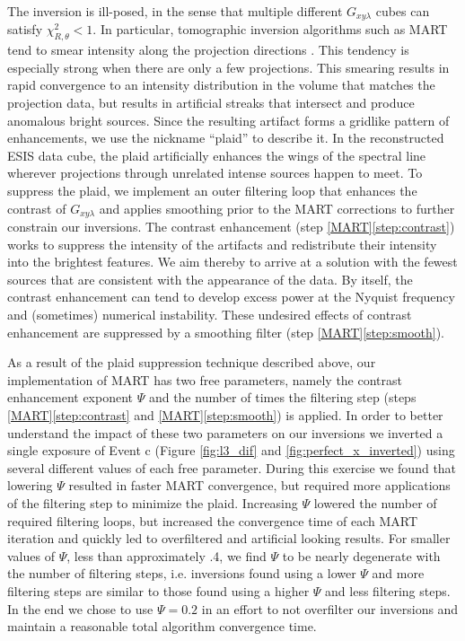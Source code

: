 \documentclass[linenumbers,trackchanges]{aastex63}
\begin{document}
The inversion is ill-posed, in the sense that multiple different $G_{xy\lambda}$ cubes can satisfy $\chi_{R,\theta}^2<1$. 
In particular, tomographic inversion algorithms such as MART tend to smear intensity along the projection directions \citep{KakSlaney2001}. 
This tendency is especially strong when there are only a few projections. 
This smearing results in rapid convergence to an intensity distribution in the volume that matches the projection data, but results in artificial streaks that intersect and produce anomalous bright sources. 
Since the resulting artifact forms a gridlike pattern of enhancements, we use the nickname ``plaid'' to describe it. 
In the reconstructed ESIS data cube, the plaid artificially enhances the wings of the spectral line wherever projections through unrelated intense sources happen to meet. 
To suppress the plaid, we implement an outer filtering loop that enhances the contrast of $G_{xy\lambda}$ and applies smoothing prior to the MART corrections to further constrain our inversions. 
The contrast enhancement (step \ref{MART}\ref{step:contrast}) works to suppress the intensity of the artifacts and redistribute their intensity into the brightest features. 
We aim thereby to arrive at a solution with the fewest sources that are consistent with the appearance of the data. 
By itself, the contrast enhancement can tend to develop excess power at the Nyquist frequency and (sometimes) numerical instability. 
These undesired effects of contrast enhancement are suppressed by a smoothing filter (step \ref{MART}\ref{step:smooth}).

As a result of the plaid suppression technique described above, our implementation of MART has two free parameters, namely the contrast enhancement exponent $\Psi$ and the number of times the filtering step (steps \ref{MART}\ref{step:contrast} and \ref{MART}\ref{step:smooth}) is applied.
In order to better understand the impact of these two parameters on our inversions we inverted a single exposure of Event c (Figure \ref{fig:l3_dif} and \ref{fig:perfect_x_inverted}) using several different values of each free parameter.
During this exercise we found that lowering $\Psi$ resulted in faster MART convergence, but required more applications of the filtering step to minimize the plaid.
Increasing $\Psi$ lowered the number of required filtering loops, but increased the convergence time of each MART iteration and quickly led to overfiltered and artificial looking results.
For smaller values of $\Psi$, less than approximately .4, we find $\Psi$ to be nearly degenerate with the number of filtering steps, i.e. inversions found using a lower $\Psi$ and more filtering steps are similar to those found using a higher $\Psi$ and less filtering steps.
In the end we chose to use $\Psi=0.2$ in an effort to not overfilter our inversions and maintain a reasonable total algorithm convergence time. 
\end{document}
